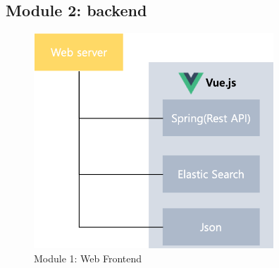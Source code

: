 \documentclass[conference]{IEEEtran}
\begin{document}
  \subsection{Module 2: backend}
\begin{figure}[htbp]
	\centerline{\includegraphics[width=90mm,scale=0.5]{fig/6_6.png}}
	\caption{Module 1: Web Frontend}
	\label{fig}
	\end{figure}
	
\end{document}
